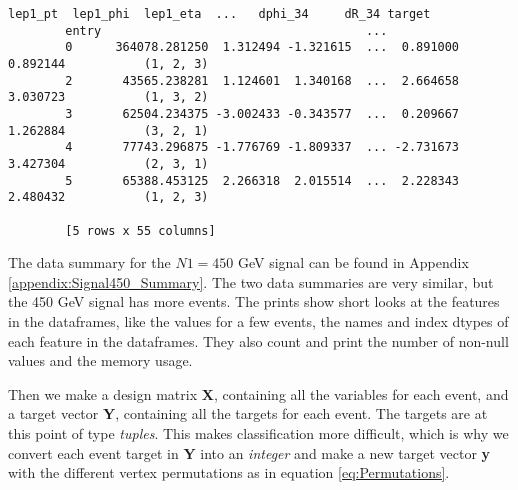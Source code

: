 \documentclass[a4paper, american, 12pt]{report}
\begin{document}
\begin{lstlisting}[caption=Inspect data.,label=InspectData]
					 lep1_pt  lep1_phi  lep1_eta  ...   dphi_34     dR_34 target
		entry                                     ...
		0      364078.281250  1.312494 -1.321615  ...  0.891000  0.892144  			(1, 2, 3)
		2       43565.238281  1.124601  1.340168  ...  2.664658  3.030723  			(1, 3, 2)
		3       62504.234375 -3.002433 -0.343577  ...  0.209667  1.262884  			(3, 2, 1)
		4       77743.296875 -1.776769 -1.809337  ... -2.731673  3.427304  			(2, 3, 1)
		5       65388.453125  2.266318  2.015514  ...  2.228343  2.480432  			(1, 2, 3)
		
		[5 rows x 55 columns]
	\end{lstlisting}
	The data summary for the $N1=450$ GeV signal can be found in Appendix \ref{appendix:Signal450_Summary}. The two data summaries are very similar, but the 450 GeV signal has more events. The prints show short looks at the features in the dataframes, like the values for a few events, the names and index dtypes of each feature in the dataframes. They also count and print the number of non-null values and the memory usage. 
	
	Then we make a design matrix \textbf{X}, containing all the variables for each event, and a target vector \textbf{Y}, containing all the targets for each event. The targets are at this point of type \textit{tuples}. This makes classification more difficult, which is why we convert each event target in \textbf{Y} into an \textit{integer} and make a new target vector \textbf{y} with the different vertex permutations as in equation \ref{eq:Permutations}. 
	
\end{document}
